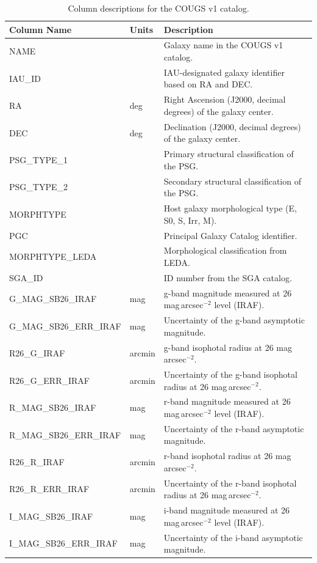 \documentclass{aa}
\begin{document}
\begin{appendix}
\begin{table}[htbp]
\centering
\caption{Column descriptions for the COUGS v1 catalog.}
\begin{tabular}{lll}
\hline
Column Name & Units & Description \\
\hline
NAME &  & Galaxy name in the COUGS v1 catalog. \\
IAU\_ID &  & IAU-designated galaxy identifier based on RA and DEC. \\
RA & deg & Right Ascension (J2000, decimal degrees) of the galaxy center. \\
DEC & deg & Declination (J2000, decimal degrees) of the galaxy center. \\
PSG\_TYPE\_1 &  & Primary structural classification of the PSG. \\
PSG\_TYPE\_2 &  & Secondary structural classification of the PSG. \\
MORPHTYPE &  & Host galaxy morphological type (E, S0, S, Irr, M). \\
PGC &  & Principal Galaxy Catalog identifier. \\
MORPHTYPE\_LEDA &  & Morphological classification from LEDA. \\
SGA\_ID &  & ID number from the SGA catalog. \\
G\_MAG\_SB26\_IRAF & mag & g-band magnitude measured at 26 mag\,arcsec$^{-2}$ level (IRAF). \\
G\_MAG\_SB26\_ERR\_IRAF & mag & Uncertainty of the g-band asymptotic magnitude. \\
R26\_G\_IRAF & arcmin & g-band isophotal radius at 26 mag\,arcsec$^{-2}$. \\
R26\_G\_ERR\_IRAF & arcmin & Uncertainty of the g-band isophotal radius at 26 mag\,arcsec$^{-2}$. \\
R\_MAG\_SB26\_IRAF & mag & r-band magnitude measured at 26 mag\,arcsec$^{-2}$ level (IRAF). \\
R\_MAG\_SB26\_ERR\_IRAF & mag & Uncertainty of the r-band asymptotic magnitude. \\
R26\_R\_IRAF & arcmin & r-band isophotal radius at 26 mag\,arcsec$^{-2}$. \\
R26\_R\_ERR\_IRAF & arcmin & Uncertainty of the r-band isophotal radius at 26 mag\,arcsec$^{-2}$. \\
I\_MAG\_SB26\_IRAF & mag & i-band magnitude measured at 26 mag\,arcsec$^{-2}$ level (IRAF). \\
I\_MAG\_SB26\_ERR\_IRAF & mag & Uncertainty of the i-band asymptotic magnitude. \\

\end{tabular}
\end{table}
\end{appendix}
\end{document}
